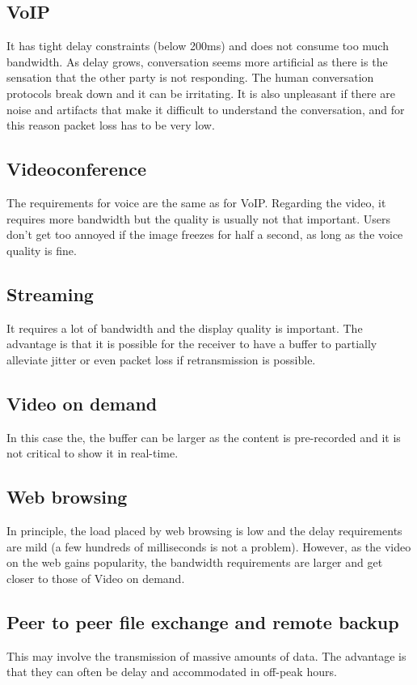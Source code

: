 \subsection{VoIP}
It has tight delay constraints (below 200ms) and does not consume too much bandwidth.
As delay grows, conversation seems more artificial as there is the sensation that the other party is not responding.
The human conversation protocols break down and it can be irritating.
It is also unpleasant if there are noise and artifacts that make it difficult to understand the conversation, and for this reason packet loss has to be very low.

\subsection{Videoconference}
The requirements for voice are the same as for VoIP.
Regarding the video, it requires more bandwidth but the quality is usually not that important.
Users don't get too annoyed if the image freezes for half a second, as long as the voice quality is fine.

\subsection{Streaming}
It requires a lot of bandwidth and the display quality is important.
The advantage is that it is possible for the receiver to have a buffer to partially alleviate jitter or even packet loss if retransmission is possible.

\subsection{Video on demand}
In this case the, the buffer can be larger as the content is pre-recorded and it is not critical to show it in real-time.

\subsection{Web browsing}
In principle, the load placed by web browsing is low and the delay requirements are mild (a few hundreds of milliseconds is not a problem). 
However, as the video on the web gains popularity, the bandwidth requirements are larger and get closer to those of Video on demand.

\subsection{Peer to peer file exchange and remote backup}
This may involve the transmission of massive amounts of data.
The advantage is that they can often be delay and accommodated in off-peak hours.


